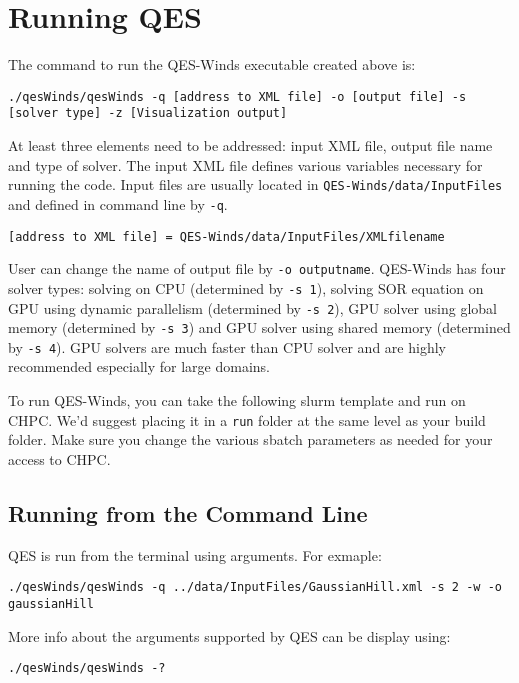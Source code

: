 \section{Running QES}

The command to run the QES-Winds executable created above is:
\begin{verbatim}
./qesWinds/qesWinds -q [address to XML file] -o [output file] -s [solver type] -z [Visualization output]
\end{verbatim}

At least three elements need to be addressed: input XML file, output file name and type of solver.
The input XML file defines various variables necessary for running the code. Input files are usually located in \verb|QES-Winds/data/InputFiles| and defined in command line by \verb|-q|.

\begin{verbatim}
[address to XML file] = QES-Winds/data/InputFiles/XMLfilename
\end{verbatim}

User can change the name of output file by  \verb|-o outputname|.
QES-Winds has four solver types: solving on CPU (determined by \verb|-s 1|), solving SOR equation on GPU using dynamic parallelism (determined by \verb|-s 2|), GPU solver using global memory (determined by \verb|-s 3|) and GPU solver using shared memory (determined by \verb|-s 4|). GPU solvers are much faster than CPU solver and are highly recommended especially for large domains.

To run QES-Winds, you can take the following slurm template and run on CHPC.  We'd suggest placing it in a \verb|run| folder at the same level as your build folder.  Make sure you change the various sbatch parameters as needed for your access to CHPC.

\subsection{Running from the Command Line}

QES is run from the terminal using arguments. For exmaple:
\begin{verbatim}
./qesWinds/qesWinds -q ../data/InputFiles/GaussianHill.xml -s 2 -w -o gaussianHill
\end{verbatim}

More info about the arguments supported by QES can be display using:
\begin{verbatim}
./qesWinds/qesWinds -?
\end{verbatim}


